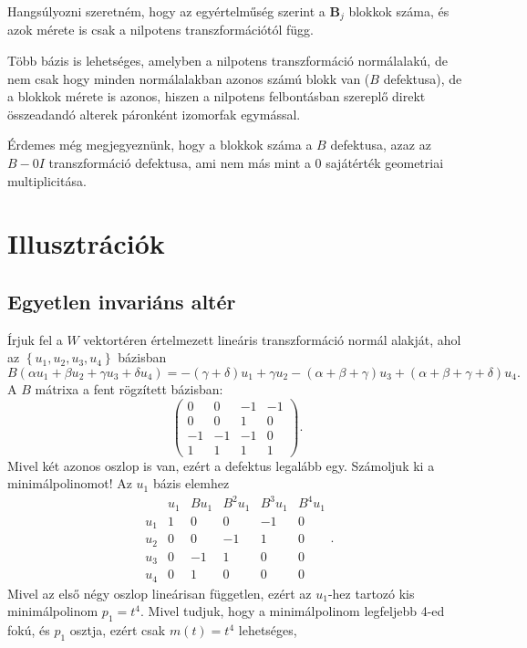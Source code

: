 \documentclass[a4paper, showtrims]{memoir}
\theoremstyle{plain}
\theoremstyle{remark}
\theoremstyle{definition}
\begin{document}
Hangsúlyozni szeretném, hogy az egyértelműség szerint a $\mathbf{B}_j$ blokkok száma, és azok mérete is csak
a nilpotens transzformációtól függ.

Több bázis is lehetséges, amelyben a nilpotens transzformáció normálalakú,
de nem csak hogy minden normálalakban azonos számú blokk van ($B$ defektusa),
de a blokkok mérete is azonos, hiszen
a nilpotens felbontásban szereplő direkt összeadandó alterek páronként izomorfak egymással.

Érdemes még megjegyeznünk, hogy a blokkok száma a $B$ defektusa,
azaz az $B-0I$ transzformáció defektusa, ami nem más mint a $0$ sajátérték geometriai multiplicitása.
\section{Illusztrációk}
\subsection{Egyetlen invariáns altér}
Írjuk fel a $W$ vektortéren értelmezett lineáris transzformáció normál alakját,
ahol az $\left\{ u_1,u_2,u_3,u_4 \right\}$ bázisban
\[
	B\left( \alpha u_1+\beta u_2+\gamma u_3+\delta u_4 \right)=
	-\left( \gamma + \delta \right)u_1
	+\gamma u_2
	-\left( \alpha+\beta+\gamma \right)u_3
	+\left( \alpha+\beta+\gamma+\delta \right)u_4.
\]
A $B$ mátrixa a fent rögzített bázisban:
\[
	\begin{pmatrix}
		0  & 0  & -1 & -1 \\
		0  & 0  & 1  & 0  \\
		-1 & -1 & -1 & 0  \\
		1  & 1  & 1  & 1
	\end{pmatrix}.
\]
Mivel két azonos oszlop is van, ezért a defektus legalább egy.
Számoljuk ki a minimálpolinomot!
Az $u_1$ bázis elemhez
\[
	\begin{array}{c|cccccc}
		    & u_1 & Bu_1 & B^2u_1 & B^3u_1 & B^4u_1 \\
		\hline
		u_1 & 1   & 0    & 0      & -1     & 0      \\
		u_2 & 0   & 0    & -1     & 1      & 0      \\
		u_3 & 0   & -1   & 1      & 0      & 0      \\
		u_4 & 0   & 1    & 0      & 0      & 0
	\end{array}.
\]
Mivel az első négy oszlop lineárisan független,
ezért az $u_1$-hez tartozó kis minimálpolinom $p_1=t^4.$
Mivel tudjuk, hogy a minimálpolinom legfeljebb 4-ed fokú, és
$p_1$ osztja, ezért csak $m\left( t \right)=t^4$ lehetséges,
\end{document}
